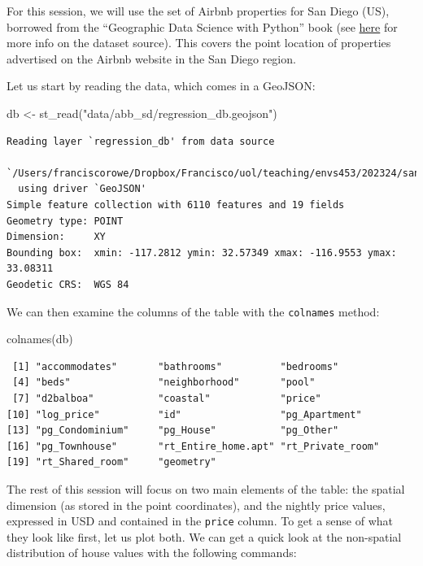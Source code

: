 \documentclass[
  letterpaper,
  DIV=11,
  numbers=noendperiod,
  oneside]{scrreprt}
\newenvironment{Shaded}{\begin{snugshade}}{\end{snugshade}}
\newcommand{\FunctionTok}[1]{\textcolor[rgb]{0.28,0.35,0.67}{#1}}
\newcommand{\NormalTok}[1]{\textcolor[rgb]{0.00,0.23,0.31}{#1}}
\newcommand{\OtherTok}[1]{\textcolor[rgb]{0.00,0.23,0.31}{#1}}
\newcommand{\StringTok}[1]{\textcolor[rgb]{0.13,0.47,0.30}{#1}}
\begin{document}
For this session, we will use the set of Airbnb properties for San Diego
(US), borrowed from the ``Geographic Data Science with Python'' book
(see
\href{https://geographicdata.science/book/data/airbnb/regression_cleaning.html}{here}
for more info on the dataset source). This covers the point location of
properties advertised on the Airbnb website in the San Diego region.

Let us start by reading the data, which comes in a GeoJSON:

\begin{Shaded}
\begin{Highlighting}[]
\NormalTok{db }\OtherTok{\textless{}{-}} \FunctionTok{st\_read}\NormalTok{(}\StringTok{"data/abb\_sd/regression\_db.geojson"}\NormalTok{)}
\end{Highlighting}
\end{Shaded}

\begin{verbatim}
Reading layer `regression_db' from data source 
  `/Users/franciscorowe/Dropbox/Francisco/uol/teaching/envs453/202324/san/data/abb_sd/regression_db.geojson' 
  using driver `GeoJSON'
Simple feature collection with 6110 features and 19 fields
Geometry type: POINT
Dimension:     XY
Bounding box:  xmin: -117.2812 ymin: 32.57349 xmax: -116.9553 ymax: 33.08311
Geodetic CRS:  WGS 84
\end{verbatim}

We can then examine the columns of the table with the \texttt{colnames}
method:

\begin{Shaded}
\begin{Highlighting}[]
\FunctionTok{colnames}\NormalTok{(db)}
\end{Highlighting}
\end{Shaded}

\begin{verbatim}
 [1] "accommodates"       "bathrooms"          "bedrooms"          
 [4] "beds"               "neighborhood"       "pool"              
 [7] "d2balboa"           "coastal"            "price"             
[10] "log_price"          "id"                 "pg_Apartment"      
[13] "pg_Condominium"     "pg_House"           "pg_Other"          
[16] "pg_Townhouse"       "rt_Entire_home.apt" "rt_Private_room"   
[19] "rt_Shared_room"     "geometry"          
\end{verbatim}

The rest of this session will focus on two main elements of the table:
the spatial dimension (as stored in the point coordinates), and the
nightly price values, expressed in USD and contained in the
\texttt{price} column. To get a sense of what they look like first, let
us plot both. We can get a quick look at the non-spatial distribution of
house values with the following commands:
\end{document}
